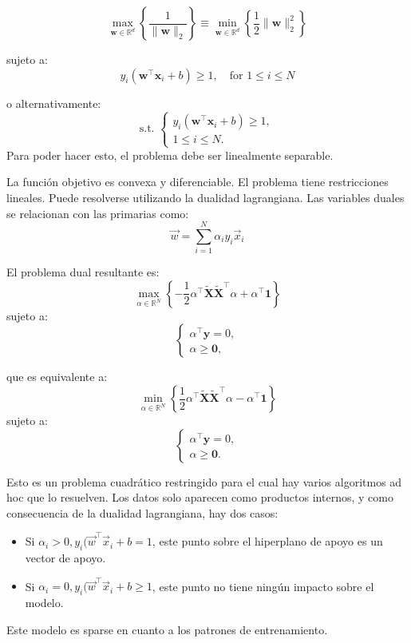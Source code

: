 $$
\max_{\mathbf{w} \in \mathbb{R}^d} \left\{ \frac{1}{\|\mathbf{w}\|_2} \right\} 
\equiv 
\min_{\mathbf{w} \in \mathbb{R}^d} \left\{ \frac{1}{2} \|\mathbf{w}\|_2^2 \right\}$$

sujeto a:
$$y_i(\mathbf{w}^\top \mathbf{x}_i + b) \geq 1, \quad \text{for } 1 \leq i \leq N$$

o alternativamente:
$$
\text{s.t. } 
\begin{cases}
y_i(\mathbf{w}^\top \mathbf{x}_i + b) \geq 1, \\
1 \leq i \leq N.
\end{cases}$$
Para poder hacer esto, el problema debe ser linealmente separable.

La función objetivo es convexa y diferenciable. El problema tiene restricciones lineales. Puede resolverse utilizando la dualidad lagrangiana. Las variables duales se relacionan con las primarias como:
$$\vec{w} = \sum^N_{i = 1} \alpha_iy_i\vec{x}_i$$

El problema dual resultante es:
$$\max_{\alpha \in \mathbb{R}^N} \left\{ -\frac{1}{2} \alpha^\top \tilde{\mathbf{X}}\tilde{\mathbf{X}}^\top \alpha + \alpha^\top \mathbf{1} \right\}$$
sujeto a:
$$\begin{cases} 
\alpha^\top \mathbf{y} = 0, \\ 
\alpha \geq \mathbf{0}, 
\end{cases}$$

que es equivalente a:
$$\min_{\alpha \in \mathbb{R}^N} \left\{ \frac{1}{2} \alpha^\top \tilde{\mathbf{X}}\tilde{\mathbf{X}}^\top \alpha - \alpha^\top \mathbf{1} \right\}$$
sujeto a:
$$\begin{cases} 
\alpha^\top \mathbf{y} = 0, \\ 
\alpha \geq \mathbf{0}. 
\end{cases}$$

Esto es un problema cuadrático restringido para el cual hay varios algoritmos ad hoc que lo resuelven. Los datos solo aparecen como productos internos, y como consecuencia de la dualidad lagrangiana, hay dos casos:
\begin{itemize}
\item Si $\alpha_i > 0, y_i(\vec{w}^\intercal \vec{x}_i + b = 1$, este punto sobre el hiperplano de apoyo es un vector de apoyo.
\item Si $\alpha_i = 0, y_i(\vec{w}^\intercal \vec{x}_i + b \geq 1$, este punto no tiene ningún impacto sobre el modelo.
\end{itemize}
Este modelo es sparse en cuanto a los patrones de entrenamiento.

